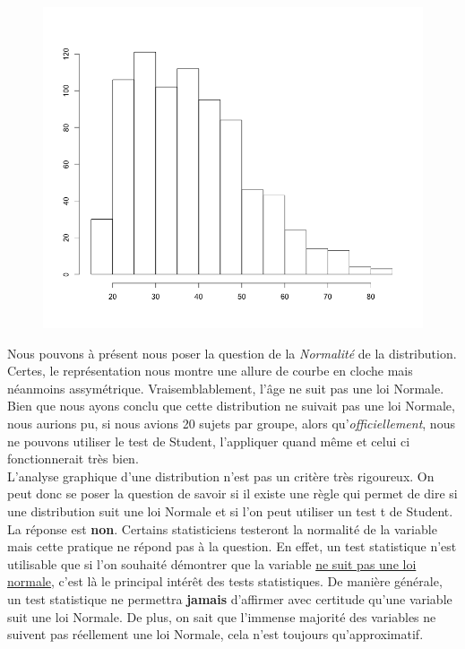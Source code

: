 \begin{figure}[H]\begin{center}\includegraphics[scale=0.4]{ilu/cd.png}\end{center}\end{figure}
Nous pouvons à présent nous poser la question de la \textit{Normalité} de la distribution. \newline
\\
Certes, le représentation nous montre une allure de courbe en cloche mais néanmoins assymétrique. Vraisemblablement, l'âge ne suit pas une loi Normale.\newline
Bien que nous ayons conclu que cette distribution ne suivait pas une loi Normale, nous aurions pu, si nous avions 20 sujets par groupe, alors qu'\textit{officiellement}, nous ne pouvons utiliser le test de Student, l'appliquer quand même  et celui ci fonctionnerait très bien.\newline
\\
L'analyse graphique d'une distribution n'est pas un critère très rigoureux. On peut donc se poser la question de savoir si il existe une règle qui permet de dire si une distribution suit une loi Normale et si l'on peut utiliser un test t de Student. La réponse est \textbf{non}. Certains statisticiens testeront la normalité de la variable mais cette pratique ne répond pas à la question.\newline
En effet, un test statistique n'est utilisable que si l'on souhaité démontrer que la variable \underline{ne suit pas une loi normale}, c'est là le principal intérêt des tests statistiques. De manière générale, un test statistique ne permettra \textbf{jamais} d'affirmer avec certitude qu'une variable suit une loi Normale. De plus, on sait que l'immense majorité des variables ne suivent pas réellement une loi Normale, cela n'est toujours qu'approximatif.\newline
